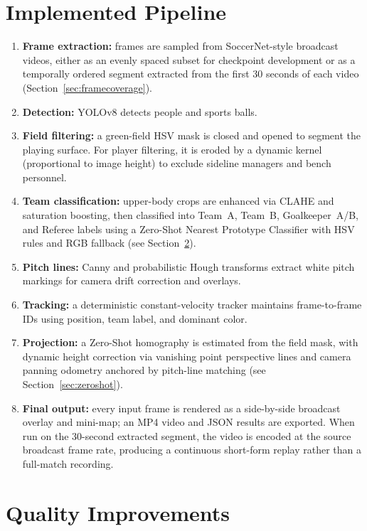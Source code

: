 \documentclass[11pt]{article}
\begin{document}
\section{Implemented Pipeline}
\begin{enumerate}[leftmargin=*]
   \item \textbf{Frame extraction:} frames are sampled from SoccerNet-style broadcast videos, either as an evenly spaced subset for checkpoint development or as a temporally ordered segment extracted from the first 30 seconds of each video (Section~\ref{sec:framecoverage}).
    \item \textbf{Detection:} YOLOv8 detects people and sports balls.
    \item \textbf{Field filtering:} a green-field HSV mask is closed and opened to segment the playing surface. For player filtering, it is eroded by a dynamic kernel (proportional to image height) to exclude sideline managers and bench personnel.
    \item \textbf{Team classification:} upper-body crops are enhanced via CLAHE and saturation boosting, then classified into Team~A, Team~B, Goalkeeper~A/B, and Referee labels using a Zero-Shot Nearest Prototype Classifier with HSV rules and RGB fallback (see Section~\ref{sec:quality}).
    \item \textbf{Pitch lines:} Canny and probabilistic Hough transforms extract white pitch markings for camera drift correction and overlays.
    \item \textbf{Tracking:} a deterministic constant-velocity tracker maintains frame-to-frame IDs using position, team label, and dominant color.
    \item \textbf{Projection:} a Zero-Shot homography is estimated from the field mask, with dynamic height correction via vanishing point perspective lines and camera panning odometry anchored by pitch-line matching (see Section~\ref{sec:zeroshot}).
    \item \textbf{Final output:} every input frame is rendered as a side-by-side broadcast overlay and mini-map; an MP4 video and JSON results are exported. When run on the 30-second extracted segment, the video is encoded at the source broadcast frame rate, producing a continuous short-form replay rather than a full-match recording.
\end{enumerate}

\section{Quality Improvements}
\label{sec:quality}
\end{document}
